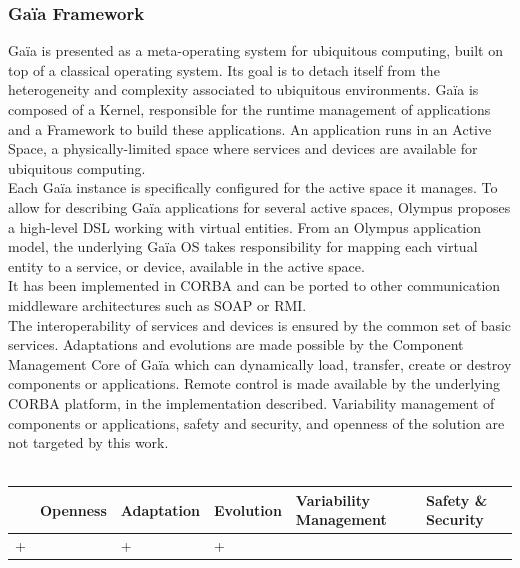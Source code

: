 \subsubsection{Ga\"ia Framework}
Ga\"ia\cite{Roman:2002} is presented as a meta-operating system for ubiquitous computing, built on top of a classical operating system. Its goal is to detach itself from the heterogeneity and complexity associated to ubiquitous environments. Ga\"ia is composed of a Kernel, responsible for the runtime management of applications and a Framework to build these applications. An application runs in an Active Space, a physically-limited space where services and devices are available for ubiquitous computing.\\
Each Ga\"ia instance is specifically configured for the active space it manages. To allow for describing Ga\"ia applications for several active spaces, Olympus\cite{Ranganathan:2005} proposes a high-level DSL working with virtual entities. From an Olympus application model, the underlying Ga\"ia OS takes responsibility for mapping each virtual entity to a service, or device, available in the active space.\\
It has been implemented in CORBA and can be ported to other communication middleware architectures such as SOAP or RMI.\\

The interoperability of services and devices is ensured by the common set of basic services. Adaptations and evolutions are made possible by the Component Management Core of Ga\"ia which can dynamically load, transfer, create or destroy components or applications. Remote control is made available by the underlying CORBA platform, in the implementation described. Variability management of components or applications, safety and security, and openness of the solution are not targeted by this work.\\
\\
\begin{tabular}{ >{\centering}m{}| >{\centering}m{} >{\centering}m{}| >{\centering}m{} >{\centering}m{}| >{\centering\arraybackslash}m{}}
{\tiny Interoperability} & {\tiny Openness} & {\tiny Adaptation} & {\tiny Evolution} & {\tiny Variability Management} & {\tiny Safety \& Security}\\
 \hline
 + &  & + & + &  &  \\ 
  \hline
\end{tabular}\\


